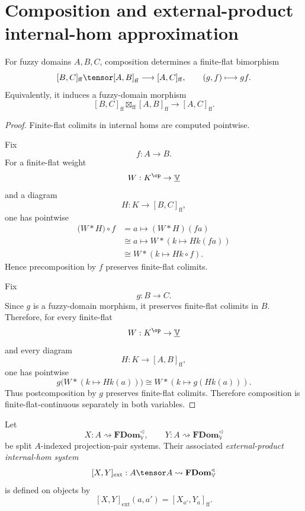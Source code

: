 \section{Composition and external-product internal-hom approximation}
\label{sec:composition-and-internal-homs-rde}

\begin{lemma}
\label{lem:separate-continuity-composition-rde}
For fuzzy domains \(A,B,C\), composition determines a finite-flat bimorphism
\[
    [B,C]_{\mathrm{ff}}\tensor [A,B]_{\mathrm{ff}}
    \longrightarrow
    [A,C]_{\mathrm{ff}},
    \qquad
    (g,f)\longmapsto gf.
\]
Equivalently, it induces a fuzzy-domain morphism
\[
    [B,C]_{\mathrm{ff}}
    \boxtimes_{\mathrm{ff}}
    [A,B]_{\mathrm{ff}}
    \longrightarrow
    [A,C]_{\mathrm{ff}}.
\]
\end{lemma}

\begin{proof}
Finite-flat colimits in internal homs are computed pointwise.

Fix
\[
    f:A\to B.
\]
For a finite-flat weight
\[
    W:K^{\op}\to\underline{\mathbb V}
\]
and a diagram
\[
    H:K\to[B,C]_{\mathrm{ff}},
\]
one has pointwise
\[
\begin{aligned}
    \bigl(W*H\bigr)\circ f
    &=
    a\longmapsto (W*H)(fa)
    \\
    &\cong
    a\longmapsto W*(k\mapsto Hk(fa))
    \\
    &\cong
    W*(k\mapsto Hk\circ f).
\end{aligned}
\]
Hence precomposition by \(f\) preserves finite-flat colimits.

Fix
\[
    g:B\to C.
\]
Since \(g\) is a fuzzy-domain morphism, it preserves finite-flat colimits in
\(B\).  Therefore, for every finite-flat
\[
    W:K^{\op}\to\underline{\mathbb V}
\]
and every diagram
\[
    H:K\to[A,B]_{\mathrm{ff}},
\]
one has pointwise
\[
    g\bigl(W*(k\mapsto Hk(a))\bigr)
    \cong
    W*(k\mapsto g(Hk(a))).
\]
Thus postcomposition by \(g\) preserves finite-flat colimits.  Therefore
composition is finite-flat-continuous separately in both variables.
\end{proof}

Let
\[
    X:A\rightsquigarrow\mathbf{FDom}_{\mathbb V}^{\triangleleft},
    \qquad
    Y:A\rightsquigarrow\mathbf{FDom}_{\mathbb V}^{\triangleleft}
\]
be split \(A\)-indexed projection-pair systems.  Their associated
\emph{external-product internal-hom system}
\[
    [X,Y]_{\mathrm{ext}}
    :
    A\tensor A
    \rightsquigarrow
    \mathbf{FDom}_{\mathbb V}^{\triangleleft}
\]
is defined on objects by
\[
    [X,Y]_{\mathrm{ext}}(a,a')
    =
    [X_{a'},Y_a]_{\mathrm{ff}}.
\]

